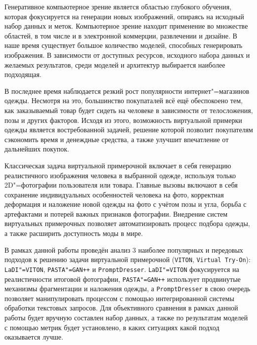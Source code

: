 \documentclass[bachelor]{SCWorks}
\begin{document}
\date{2025}

\maketitle

\secNumbering
\tableofcontents

\intro
Генеративное компьютерное зрение является областью глубокого обучения, которая фокусируется на генерации новых изображений, опираясь на исходный набор данных и меток. Компьютерное зрение находит применение во множестве областей, в том числе и в электронной коммерции, развлечении и дизайне. В наше время существует большое количество моделей, способных генерировать изображения. В зависимости от доступных ресурсов, исходного набора данных и желаемых результатов, среди моделей и архитектур выбирается наиболее подходящая. 

В последнее время наблюдается резкий рост популярности интернет"=магазинов одежды. Несмотря на это, большинство покупаталей всё ещё обеспокоено тем, как заказываемый товар будет сидеть на человеке в зависимости от телосложения, позы и других факторов. Исходя из этого, возможность виртуальной примерки одежды является востребованной задачей, решение которой позволит покупателям сэкономить время и денеждные средства, а также улучшит впечатление от дальнейших покупок.

Классическая задача виртуальной примерочной включает в себя генерацию реалистичного изображения человека в выбранной одежде, используя только 2D"=фотографии пользователя или товара. Главные вызовы включают в себя сохранение индивидуальных особенностей человека на фото, корректная деформация и наложение новой одежды на фото с учётом позы и угла, борьба с артефактами и потерей важных признаков фотографии. Внедрение систем виртуальных примерочных позволяет автоматизировать процесс подбора одежды, а также расширить доступность моды в мире. 

В рамках данной работы проведён анализ 3 наиболее популярных и передовых подходов к решению задачи виртуальной примерочной (\texttt{VITON}, \texttt{Virtual Try-On}): \texttt{LaDI"=VITON}, \texttt{PASTA"=GAN++} и \texttt{PromptDresser}. \texttt{LaDI"=VITON} фокусируется на реалистичности итоговой фотографии, \texttt{PASTA"=GAN++} использует продвинутые механизмы фрагментации и наложения одежды, а \texttt{PromptDresser} в свою очередь позволяет манипулировать процессом с помощью интегрированной системы обработки текстовых запросов.  Для объективного сравнения в рамках данной работы будет вручную составлен набор данных, а также по результатам моделей с помощью метрик будет установлено, в каких ситуациях какой подход оказывается лучше.
\end{document}
